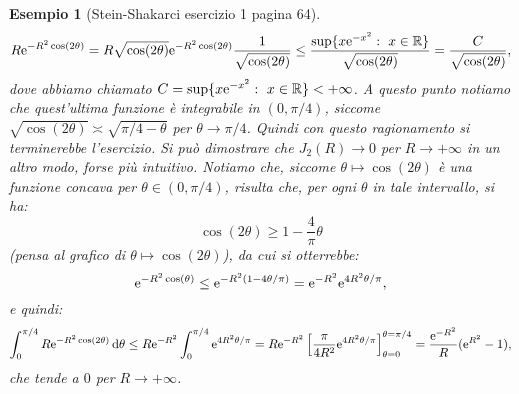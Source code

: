 \documentclass[11pt]{book}
\theoremstyle{Definizione}
\theoremstyle{TeoremaProposizioneLemmaCorollarioCongettura}
\theoremstyle{OsservazioneNotaEsempio}
\newtheorem{myes}{Esempio}[section]
\newcommand{\R}{\mathbb{R}}
\newcommand{\e}{\textup{e}}
\renewcommand{\d}{\mathrm{d}}
\newcommand{\dtheta}{\, \d \theta}
\begin{document}
\begin{myes}[Stein-Shakarci esercizio 1 pagina 64]
$$
R \e^{-R^2 \cos(2\theta)} = R \sqrt{\cos(2\theta)} \e^{-R^2\cos(2\theta)} \frac{1}{\sqrt{\cos(2\theta)}} \leq \frac{\sup\{x\e^{-x^2}:\ x\in \R\}}{\sqrt{\cos(2\theta)}} = \frac{C}{\sqrt{\cos(2\theta)}},
$$
dove abbiamo chiamato $C = \sup\{x\e^{-x^2}:\ x\in \R\}<+\infty$. A questo punto notiamo che quest'ultima funzione è integrabile in $(0,\pi/4)$, siccome $\sqrt{\cos(2\theta)} \asymp \sqrt{\pi/4-\theta}$ per $\theta \to \pi/4$. Quindi con questo ragionamento si terminerebbe l'esercizio. Si può dimostrare che $J_2(R) \to 0$ per $R \to +\infty$ in un altro modo, forse più intuitivo. Notiamo che, siccome $\theta\longmapsto \cos(2\theta)$ è una funzione concava per $\theta \in (0,\pi/4)$, risulta che, per ogni $\theta$ in tale intervallo, si ha:
$$
\cos(2\theta) \geq 1-\frac{4}{\pi}\theta
$$
(pensa al grafico di $\theta \longmapsto \cos(2\theta)$), da cui si otterrebbe:
$$
\e^{-R^2\cos(\theta)} \leq \e^{-R^2(1-4\theta/\pi)} = \e^{-R^2}\e^{4R^2\theta/\pi},
$$
e quindi:
$$
\int_0^{\pi/4} R\e^{-R^2\cos(2\theta)} \dtheta \leq R\e^{-R^2}\int_0^{\pi/4} \e^{4R^2\theta/\pi} = R\e^{-R^2} \left[\frac{\pi}{4R^2}\e^{4R^2\theta/\pi}\right]_{\theta = 0}^{\theta = \pi/4} = \frac{\e^{-R^2}}{R}(\e^{R^2}-1),
$$
che tende a $0$ per $R \to +\infty$.
\end{myes}
\end{document}

